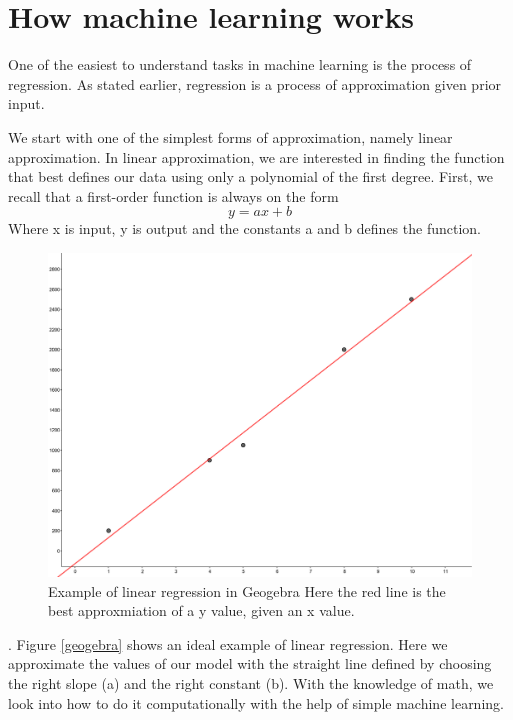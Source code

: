     
\section{How machine learning works}   
One of the easiest to understand tasks in machine learning is the process of regression. As stated earlier, regression is a process of approximation given prior input.

We start with one of the simplest forms of approximation, namely linear approximation. In linear approximation, we are interested in finding the function that best defines our data using only a polynomial of the first degree.  First, we recall that a first-order function is always on the form
\begin{equation}
y = ax +b 
\end{equation}
Where x is input, y is output and the constants a and b  defines the function.
    
\begin{figure}
\centering
\includegraphics[scale=0.05]{background/figures/linear_regression.png}
\caption{Example of linear regression in Geogebra Here the red line is the best approxmiation of a y value, given an x value.} 
\label{fig:geogebra}
\end{figure} %
.
Figure \ref{geogebra} shows an ideal example of linear regression. Here we approximate the values of our model with the straight line defined by choosing the right slope (a) and the right constant (b).
With the knowledge of math, we look into how to do it computationally with the help of simple machine learning. 

